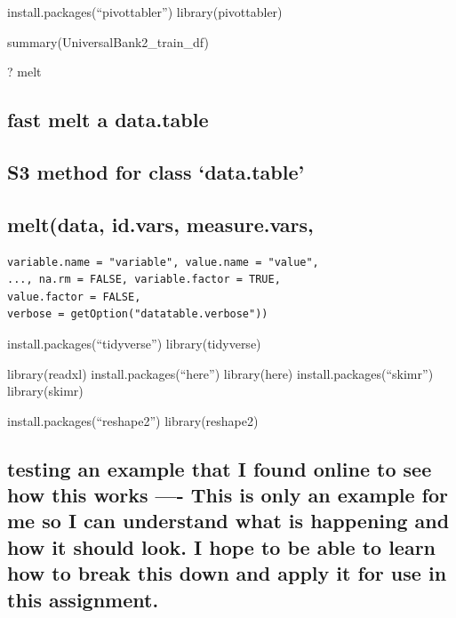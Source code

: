 \documentclass[
]{article}
\begin{document}
install.packages(``pivottabler'') library(pivottabler)

summary(UniversalBank2\_train\_df)

? melt

\hypertarget{fast-melt-a-data.table}{%
\subsection{fast melt a data.table}\label{fast-melt-a-data.table}}

\hypertarget{s3-method-for-class-data.table}{%
\subsection{S3 method for class
`data.table'}\label{s3-method-for-class-data.table}}

\hypertarget{meltdata-id.vars-measure.vars}{%
\subsection{melt(data, id.vars,
measure.vars,}\label{meltdata-id.vars-measure.vars}}

\begin{verbatim}
variable.name = "variable", value.name = "value",
..., na.rm = FALSE, variable.factor = TRUE,
value.factor = FALSE,
verbose = getOption("datatable.verbose"))
\end{verbatim}

install.packages(``tidyverse'') library(tidyverse)

library(readxl) install.packages(``here'') library(here)
install.packages(``skimr'') library(skimr)

install.packages(``reshape2'') library(reshape2)

\hypertarget{testing-an-example-that-i-found-online-to-see-how-this-works---this-is-only-an-example-for-me-so-i-can-understand-what-is-happening-and-how-it-should-look.-i-hope-to-be-able-to-learn-how-to-break-this-down-and-apply-it-for-use-in-this-assignment.}{%
\subsection{testing an example that I found online to see how this works
---- This is only an example for me so I can understand what is
happening and how it should look. I hope to be able to learn how to
break this down and apply it for use in this
assignment.}\label{testing-an-example-that-i-found-online-to-see-how-this-works---this-is-only-an-example-for-me-so-i-can-understand-what-is-happening-and-how-it-should-look.-i-hope-to-be-able-to-learn-how-to-break-this-down-and-apply-it-for-use-in-this-assignment.}}
\end{document}
